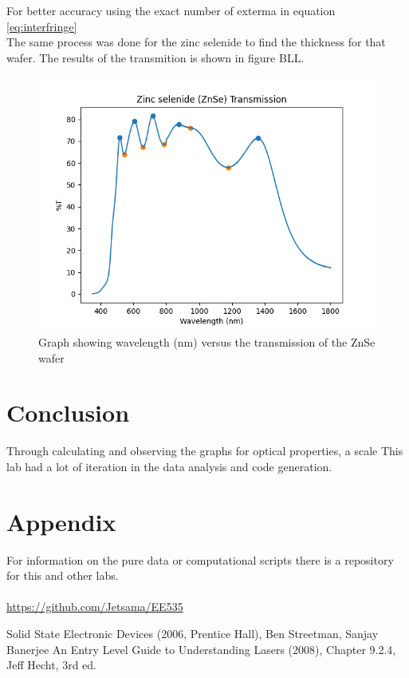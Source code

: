 \documentclass[10pt,a4paper]{article}
\begin{document}
\begin{multicols}{2}
For better accuracy using the exact number of exterma in equation \ref{eq:interfringe}\\


The same process was done for the zinc selenide to find the thickness for that wafer. The results of the transmition is shown in figure BLL.
\begin{figure}[H]
\label{znsetran}
\includegraphics[scale=0.5]{znsetp}
\caption{Graph showing wavelength (nm) versus the transmission of the ZnSe wafer }
\end{figure}
    
\section*{Conclusion}
Through calculating and observing the graphs for optical properties, a scale This lab had a lot of iteration in the data analysis and code generation. 



\section*{Appendix}
For information on the pure data or computational scripts there is a repository for this and other labs. \\
\\\href{https://github.com/Jetsama/EE535}{https://github.com/Jetsama/EE535}

\begin{thebibliography}{9}
 Solid State Electronic Devices (2006, Prentice Hall), Ben Streetman, Sanjay Banerjee
An Entry Level Guide to Understanding Lasers (2008), Chapter 9.2.4, Jeff Hecht, 3rd ed. 


\end{thebibliography}
\end{multicols}
\end{document}
